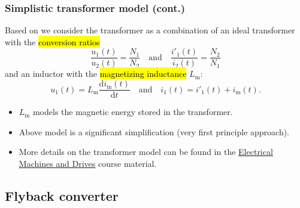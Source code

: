 \begin{frame}
    \frametitle{Simplistic transformer model (cont.)}
    Based on  we consider the transformer as a combination of an ideal transformer with the \hl{conversion ratios}
    \begin{equation}
        \frac{u_1(t)}{u_2(t)} = \frac{N_1}{N_2} \quad \text{and} \quad \frac{i'_1(t)}{i_2(t)} = \frac{N_2}{N_1}
    \end{equation}\pause%
    and an inductor with the \hl{magnetizing inductance} $L_\mathrm{m}$:
    \begin{equation}
        u_1(t) = L_\mathrm{m} \frac{\mathrm{d}i_\mathrm{m}(t)}{\mathrm{d}t} \quad \text{and} \quad i_1(t) = i'_1(t) + i_\mathrm{m}(t).
    \end{equation}\pause %
    \begin{itemize}
        \item<3-> $L_\mathrm{m}$ models the magnetic energy stored in the transformer.
        \item<4-> Above model is a significant simplification (very first principle approach).
        \item<5-> More details on the transformer model can be found in the \href{https://github.com/IAS-Uni-Siegen/EMD_course}{Electrical Machines and Drives} course material.
    \end{itemize}
\end{frame}

\subsection{Flyback converter}

